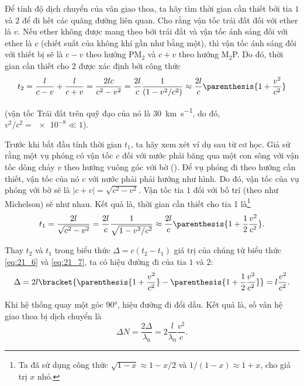 Để tính độ dịch chuyển của vân giao thoa, ta hãy tìm thời gian cần thiết bởi tia $1$ và $2$ để đi hết các quãng đường liên quan.
Cho rằng vận tốc trái đất đối với ether là $v$.
Nếu ether không được mang theo bởi trái đất và vận tốc ánh sáng đối với ether là $c$ (chiết suất của không khí gần như bằng một), thì vận tốc ánh sáng đối với thiết bị sẽ là $c - v$ theo hướng PM$_2$ và $c + v$ theo hướng M$_2$P.
Do đó, thời gian cần thiết cho $2$ được xác định bởi công thức
\begin{equation}\label{eq:21_6}
	t_2 = \frac{l}{c-v} + \frac{l}{c+v} = \frac{2lc}{c^2-v^2} = \frac{2l}{c} \frac{1}{(1-v^2/c^2)} \approx \frac{2l}{c} \parenthesis{1 + \frac{v^2}{c^2}}
\end{equation}

\noindent
(vận tốc Trái đất trên quỹ đạo của nó là \SI{30}{km.s^{-1}}, do đó, $v^2/c^2= \num{e-8}\ll 1$).

Trước khi bắt đầu tính thời gian $t_1$, ta hãy xem xét ví dụ sau từ cơ học.
Giả sử rằng một vụ phóng có vận tốc $c$ đối với nước phải băng qua một con sông với vận tốc dòng chảy $v$ theo hướng vuông góc với bờ ().
Để vụ phóng đi theo hướng cần thiết, vận tốc của nó $c$ với nước phải phải hướng như hình.
Do đó, vận tốc của vụ phóng với bờ sẽ là $|c+v|=\sqrt{c^2-v^2}$.
Vận tốc tia $1$ đối với bố trí (theo như Michelson) sẽ như nhau.
Kết quả là, thời gian cần thiết cho tia 1 là\footnote{Ta đã sử dụng công thức $\sqrt{1- x}\approx 1-x/2$ và $1/(1-x) \approx 1+x$, cho giá trị $x$ nhỏ.}
\begin{equation}\label{eq:21_7}
	t_1 = \frac{2l}{\sqrt{c^2-v^2}} = \frac{2l}{c} \frac{1}{\sqrt{1-v^2/c^2}} \approx \frac{2l}{c} \parenthesis{1 + \frac{1}{2} \frac{v^2}{c^2}}.
\end{equation}

Thay $t_2$ và $t_1$ trong biểu thức $\Delta=c(t_2 - t_1)$ giá trị của chúng từ biểu thức \eqref{eq:21_6} và \eqref{eq:21_7}, ta có hiệu đường đi của tia $1$ và $2$:
\begin{equation*}
	\Delta = 2l \bracket{\parenthesis{1+\frac{v^2}{c^2}} - \parenthesis{1 + \frac{1}{2} \frac{v^2}{c^2}}} = l \frac{v^2}{c^2}.
\end{equation*}

\noindent
Khi hệ thống quay một góc \ang{90}, hiệu đường đi đổi dấu.
Kết quả là, số vân hệ giao thoa bị dịch chuyển là
\begin{equation}\label{eq:21_8}
	\Delta{N} = \frac{2\Delta}{\lambda_0} = 2 \frac{l}{\lambda_0} \frac{v^2}{c}.
\end{equation}

